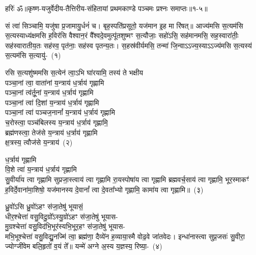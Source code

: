 {\anuvakamend[{दिवा॒ स स॑ह॒स्रिणं॒ वैश्वा॑नरा\-ऽऽ\-दित्य॒ तू नो॑\-ऽने॒हसꣳ॑ सु॒शर्मा॑ण॒मेका॒न्न\-विꣳ॑श॒तिश्च॑}]}%

{हरिः॑ ॐ}{॥कृष्ण-यजुर्वेदीय-तैत्तिरीय-संहितायां प्रथमकाण्डे पञ्चमः प्रश्नः समाप्तः॥१-५॥}

\setcounter{anuvakam}{0}
सं त्वा॑ सिञ्चामि॒ यजु॑षा प्र॒जामायु॒र्धनं॑ च। बृह॒स्पति॑प्रसूतो॒ यज॑मान इ॒ह मा रि॑षत्॥ आज्य॑मसि स॒त्यम॑सि स॒त्यस्याध्य॑क्षमसि ह॒विर॑सि वैश्वान॒रं वै᳚श्वदे॒वमुत्पू॑तशुष्मꣳ स॒त्यौजाः॒ सहो॑\-ऽसि॒ सह॑मानमसि॒ सह॒स्वारा॑तीः॒ सह॑स्वारातीय॒तः सह॑स्व॒ पृत॑नाः॒ सह॑स्व पृतन्य॒तः। स॒हस्र॑वीर्यमसि॒ तन्मा॑ जि॒न्वा\-ऽऽ\-ज्य॒स्या\-ऽऽ\-ज्य॑मसि स॒त्यस्य॑ स॒त्यम॑सि स॒त्यायु॑-~(१)

रसि स॒त्यशु॑ष्ममसि स॒त्येन॑ त्वा॒\-ऽभि घा॑रयामि॒ तस्य॑ ते भक्षीय\\
पञ्चा॒नां त्वा॒ वाता॑नां य॒न्त्राय॑ ध॒र्त्राय॑ गृह्णामि\\
पञ्चा॒नां त्व॑र्तू॒नां य॒न्त्राय॑ ध॒र्त्राय॑ गृह्णामि\\
पञ्चा॒नां त्वा॑ दि॒शां य॒न्त्राय॑ ध॒र्त्राय॑ गृह्णामि\\
पञ्चा॒नां त्वा॑ पञ्चज॒नानां᳚ य॒न्त्राय॑ ध॒र्त्राय॑ गृह्णामि\\
च॒रोस्त्वा॒ पञ्च॑बिलस्य य॒न्त्राय॑ ध॒र्त्राय॑ गृह्णामि॒\\
ब्रह्म॑णस्त्वा॒ तेज॑से य॒न्त्राय॑ ध॒र्त्राय॑ गृह्णामि\\
क्ष॒त्रस्य॒ त्वौज॑से य॒न्त्राय॑~(२)

ध॒र्त्राय॑ गृह्णामि\\
वि॒शे त्वा॑ य॒न्त्राय॑ ध॒र्त्राय॑ गृह्णामि\\
सु॒वीर्या॑य त्वा गृह्णामि सुप्रजा॒स्त्वाय॑ त्वा गृह्णामि रा॒यस्पोषा॑य त्वा गृह्णामि ब्रह्मवर्च॒साय॑ त्वा गृह्णामि॒ भूर॒स्माकꣳ॑ ह॒विर्दे॒वाना॑मा॒शिषो॒ यज॑मानस्य दे॒वानां᳚ त्वा दे॒वता᳚भ्यो गृह्णामि॒ कामा॑य त्वा गृह्णामि॥~(३)

{\anuvakamend[{स॒त्यायु॒रोज॑से य॒न्त्राय॒ त्रय॑स्त्रिꣳशच्च}]}%

ध्रु॒वो॑\-ऽसि ध्रु॒वो॑\-ऽहꣳ स॑जा॒तेषु॑ भूयासं॒\\
धीर॒श्चेत्ता॑ वसु॒विदु॒ग्रो᳚\-ऽस्यु॒ग्रो॑\-ऽहꣳ स॑जा॒तेषु॑ भूयास-\\
मु॒ग्रश्चेत्ता॑ वसु॒विद॑भि॒भूर॑स्यभि॒भूर॒हꣳ स॑जा॒तेषु॑ भूयास-\\
मभि॒भूश्चेत्ता॑ वसु॒विद्यु॒नज्मि॑ त्वा॒ ब्रह्म॑णा॒ दैव्ये॑न ह॒व्याया॒स्मै वोढ॒वे जा॑तवेदः। इन्धा॑नास्त्वा सुप्र॒जसः॑ सु॒वीरा॒ ज्योग्जी॑वेम बलि॒हृतो॑ व॒यं ते᳚॥ यन्मे॑ अग्ने अ॒स्य य॒ज्ञस्य॒ रिष्या॒-~(४)

